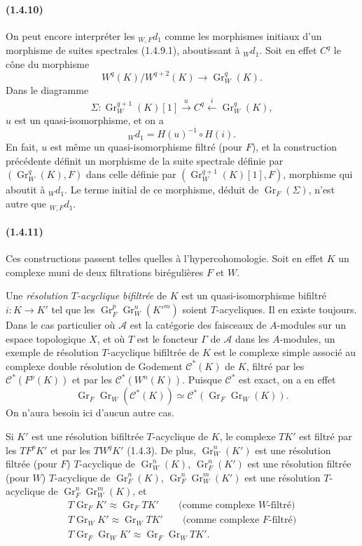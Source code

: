\documentclass[10pt]{article}
\newcommand{\Gr}{\operatorname{Gr}}
\newcommand{\calA}{\mathcal A}
\begin{document}
\paragraph{(1.4.10)} On peut encore interpréter les ${}_{W,F}d_1$ comme les morphismes initiaux d'un morphisme de suites spectrales (1.4.9.1), aboutissant à ${}_Wd_1$. Soit en effet $C^q$ le cône du morphisme
\[
W^q(K)/W^{q+2}(K)\longrightarrow\Gr_W^q(K).
\]
Dans le diagramme
\[
\Sigma:\Gr_W^{q+1}(K)[1]\xrightarrow{u} C^q\xleftarrow{i}\Gr_W^q(K),
\]
$u$ est un quasi-isomorphisme, et on a
\[
{}_Wd_1=H(u)^{-1}\circ H(i).
\]
En fait, $u$ est même un quasi-isomorphisme filtré (pour $F$), et la construction précédente définit un morphisme de la suite spectrale définie par $(\Gr_W^q(K),F)$ dans celle définie par $(\Gr_W^{q+1}(K)[1],F)$, morphisme qui aboutit à ${}_Wd_1$. Le terme initial de ce morphisme, déduit de $\Gr_F(\Sigma)$, n'est autre que ${}_{W,F}d_1$.

\paragraph{(1.4.11)} Ces constructions passent telles quelles à l'hypercohomologie. Soit en effet $K$ un complexe muni de deux filtrations birégulières $F$ et $W$.

Une \emph{résolution $T$-acyclique bifiltrée} de $K$ est un quasi-isomorphisme bifiltré $i:K\to K'$ tel que les $\Gr_F^p\Gr_W^n(K'^m)$ soient $T$-acycliques. Il en existe toujours. Dans le cas particulier où $\calA$ est la catégorie des faisceaux de $A$-modules sur un espace topologique $X$, et où $T$ est le foncteur $\Gamma$ de $\calA$ dans les $A$-modules, un exemple de résolution $T$-acyclique bifiltrée de $K$ est le complexe simple associé au complexe double résolution de Godement $\mathcal C^*(K)$ de $K$, filtré par les $\mathcal C^*(F^p(K))$ et par les $\mathcal C^*(W^n(K))$. Puisque $\mathcal C^*$ est exact, on a en effet
\[
\Gr_F\Gr_W(\mathcal C^*(K))\simeq \mathcal C^*(\Gr_F\Gr_W(K)).
\]
On n'aura besoin ici d'aucun autre cas.

Si $K'$ est une résolution bifiltrée $T$-acyclique de $K$, le complexe $TK'$ est filtré par les $TF^pK'$ et par les $TW^qK'$ (1.4.3). De plus, $\Gr_W^n(K')$ est une résolution filtrée (pour $F$) $T$-acyclique de $\Gr_W^n(K)$, $\Gr_F^n(K')$ est une résolution filtrée (pour $W$) $T$-acyclique de $\Gr_F^n(K)$, $\Gr_F^n\Gr_W^m(K')$ est une résolution $T$-acyclique de $\Gr_F^n\Gr_W^m(K)$, et
\[
\begin{gathered}
T\Gr_FK'\approx\Gr_FTK'\qquad\text{(comme complexe $W$-filtré)}\\
T\Gr_WK'\approx\Gr_WTK'\qquad\text{(comme complexe $F$-filtré)}\\
T\Gr_F\Gr_WK'\approx\Gr_F\Gr_WTK'.
\end{gathered}
\]
\end{document}
